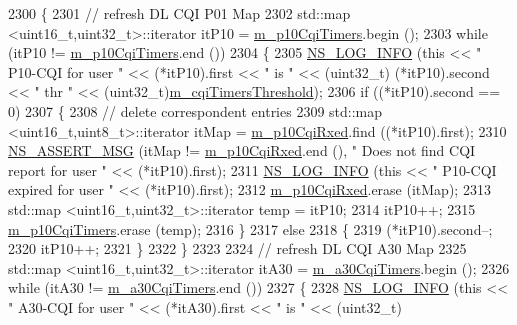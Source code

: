 \begin{DoxyCode}
2300 \{
2301   \textcolor{comment}{// refresh DL CQI P01 Map}
2302   std::map <uint16\_t,uint32\_t>::iterator itP10 = \hyperlink{classns3_1_1FdTbfqFfMacScheduler_a9ef02ee999e33adc46b3ab820ea6450d}{m\_p10CqiTimers}.begin ();
2303   \textcolor{keywordflow}{while} (itP10 != \hyperlink{classns3_1_1FdTbfqFfMacScheduler_a9ef02ee999e33adc46b3ab820ea6450d}{m\_p10CqiTimers}.end ())
2304     \{
2305       \hyperlink{group__logging_gafbd73ee2cf9f26b319f49086d8e860fb}{NS\_LOG\_INFO} (\textcolor{keyword}{this} << \textcolor{stringliteral}{" P10-CQI for user "} << (*itP10).first << \textcolor{stringliteral}{" is "} << (uint32\_t)
      (*itP10).second << \textcolor{stringliteral}{" thr "} << (uint32\_t)\hyperlink{classns3_1_1FdTbfqFfMacScheduler_a5699ce6b376d8919bd386101b5c55e4a}{m\_cqiTimersThreshold});
2306       \textcolor{keywordflow}{if} ((*itP10).second == 0)
2307         \{
2308           \textcolor{comment}{// delete correspondent entries}
2309           std::map <uint16\_t,uint8\_t>::iterator itMap = \hyperlink{classns3_1_1FdTbfqFfMacScheduler_a9f978cfdf8024b324d38301a06546cf7}{m\_p10CqiRxed}.find ((*itP10).first);
2310           \hyperlink{assert_8h_aff5ece9066c74e681e74999856f08539}{NS\_ASSERT\_MSG} (itMap != \hyperlink{classns3_1_1FdTbfqFfMacScheduler_a9f978cfdf8024b324d38301a06546cf7}{m\_p10CqiRxed}.end (), \textcolor{stringliteral}{" Does not find CQI report
       for user "} << (*itP10).first);
2311           \hyperlink{group__logging_gafbd73ee2cf9f26b319f49086d8e860fb}{NS\_LOG\_INFO} (\textcolor{keyword}{this} << \textcolor{stringliteral}{" P10-CQI expired for user "} << (*itP10).first);
2312           \hyperlink{classns3_1_1FdTbfqFfMacScheduler_a9f978cfdf8024b324d38301a06546cf7}{m\_p10CqiRxed}.erase (itMap);
2313           std::map <uint16\_t,uint32\_t>::iterator temp = itP10;
2314           itP10++;
2315           \hyperlink{classns3_1_1FdTbfqFfMacScheduler_a9ef02ee999e33adc46b3ab820ea6450d}{m\_p10CqiTimers}.erase (temp);
2316         \}
2317       \textcolor{keywordflow}{else}
2318         \{
2319           (*itP10).second--;
2320           itP10++;
2321         \}
2322     \}
2323 
2324   \textcolor{comment}{// refresh DL CQI A30 Map}
2325   std::map <uint16\_t,uint32\_t>::iterator itA30 = \hyperlink{classns3_1_1FdTbfqFfMacScheduler_a64ea10738e270f2cbb6d456c3851fcef}{m\_a30CqiTimers}.begin ();
2326   \textcolor{keywordflow}{while} (itA30 != \hyperlink{classns3_1_1FdTbfqFfMacScheduler_a64ea10738e270f2cbb6d456c3851fcef}{m\_a30CqiTimers}.end ())
2327     \{
2328       \hyperlink{group__logging_gafbd73ee2cf9f26b319f49086d8e860fb}{NS\_LOG\_INFO} (\textcolor{keyword}{this} << \textcolor{stringliteral}{" A30-CQI for user "} << (*itA30).first << \textcolor{stringliteral}{" is "} << (uint32\_t)

\end{DoxyCode}
